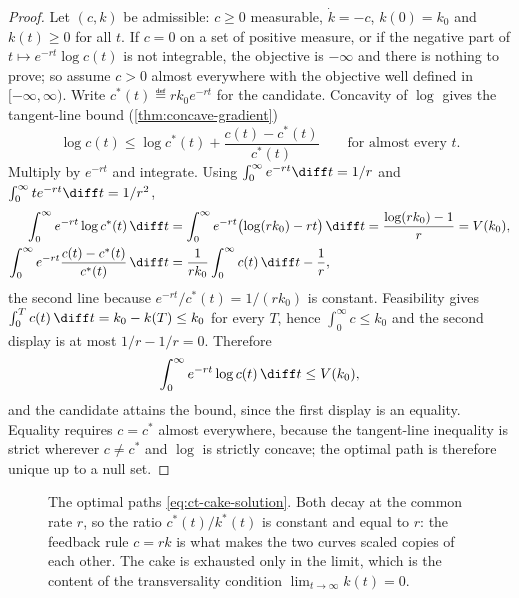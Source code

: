 \begin{proof}
	Let $(c,k)$ be admissible: $c\geq0$ measurable, $\dot k=-c$, $k(0)=k_0$ and
	$k(t)\geq0$ for all $t$. If $c=0$ on a set of positive measure, or if the
	negative part of $t\mapsto e^{-rt}\log c(t)$ is not integrable, the objective is
	$-\infty$ and there is nothing to prove; so assume $c>0$ almost everywhere with
	the objective well defined in $[-\infty,\infty)$. Write
	$c^{\ast}(t)\eqdef rk_0e^{-rt}$ for the candidate. Concavity of $\log$ gives the
	tangent-line bound (\autoref{thm:concave-gradient})
	\[
		\log c(t)\leq\log c^{\ast}(t)+\frac{c(t)-c^{\ast}(t)}{c^{\ast}(t)}
		\qquad\text{for almost every }t .
	\]
	Multiply by $e^{-rt}$ and integrate. Using
	$\int_0^{\infty}e^{-rt}\diff t=1/r$ and
	$\int_0^{\infty}te^{-rt}\diff t=1/r^{2}$,
	\begin{align*}
		\int_0^{\infty}e^{-rt}\log c^{\ast}(t)\,\diff t
		 & =\int_0^{\infty}e^{-rt}\bigl(\log(rk_0)-rt\bigr)\,\diff t
		=\frac{\log(rk_0)-1}{r}=V(k_0),                                            \\
		\int_0^{\infty}e^{-rt}\frac{c(t)-c^{\ast}(t)}{c^{\ast}(t)}\,\diff t
		 & =\frac{1}{rk_0}\int_0^{\infty}c(t)\,\diff t-\frac1r,
	\end{align*}
	the second line because $e^{-rt}/c^{\ast}(t)=1/(rk_0)$ is constant. Feasibility
	gives $\int_0^{T}c(t)\,\diff t=k_0-k(T)\leq k_0$ for every $T$, hence
	$\int_0^{\infty}c\leq k_0$ and the second display is at most $1/r-1/r=0$.
	Therefore
	\[
		\int_0^{\infty}e^{-rt}\log c(t)\,\diff t\leq V(k_0),
	\]
	and the candidate attains the bound, since the first display is an equality.
	Equality requires $c=c^{\ast}$ almost everywhere, because the tangent-line
	inequality is strict wherever $c\neq c^{\ast}$ and $\log$ is strictly concave;
	the optimal path is therefore unique up to a null set.
\end{proof}

\begin{figure}[htbp]
	\centering
	
	\caption[Optimal paths in the continuous-time cake problem]{The optimal
		paths \eqref{eq:ct-cake-solution}. Both decay at the common rate $r$, so
		the ratio $c^{\ast}(t)/k^{\ast}(t)$ is constant and equal to $r$: the
		feedback rule $c=rk$ is what makes the two curves scaled copies of each
		other. The cake is exhausted only in the limit, which is the content of
		the transversality condition $\lim_{t\to\infty}k(t)=0$.}
	\label{fig:cake-paths}
\end{figure}

